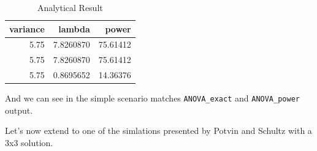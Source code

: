 \documentclass[]{book}
\begin{document}
\begin{table}[!h]

\caption{\label{tab:unnamed-chunk-163}Analytical Result}
\centering
\begin{tabular}{r|r|r}
\hline
variance & lambda & power\\
\hline
5.75 & 7.8260870 & 75.61412\\
\hline
5.75 & 7.8260870 & 75.61412\\
\hline
5.75 & 0.8695652 & 14.36376\\
\hline
\end{tabular}
\end{table}

And we can see in the simple scenario matches \texttt{ANOVA\_exact} and \texttt{ANOVA\_power} output.

Let's now extend to one of the simlations presented by Potvin and Schultz with a 3x3 solution.
\end{document}
